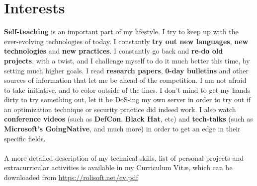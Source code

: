 \documentclass[11pt,a4paper,sans]{moderncv}
\begin{document}
\section{Interests}
	\textbf{Self-teaching} is an important part of my lifestyle. I try to keep up with the ever-evolving technologies of today. I constantly \textbf{try out new languages}, \textbf{new technologies} and \textbf{new practices}. I constantly go back and \textbf{re-do old projects}, with a twist, and I challenge myself to do it much better this time, by setting much higher goals. I read \textbf{research papers}, \textbf{0-day bulletins} and other sources of information that let me be ahead of the competition. I am not afraid to take initiative, and to color outside of the lines. I don't mind to get my hands dirty to try something out, let it be DoS-ing my own server in order to try out if an optimization technique or security practice did indeed work. I also watch \textbf{conference videos} (such as \textbf{DefCon}, \textbf{Black Hat}, etc) and \textbf{tech-talks} (such as \textbf{Microsoft's GoingNative}, and much more) in order to get an edge in their specific fields.
	\\\\
	{\color{color2} A more detailed description of my technical skills, list of personal projects and extracurricular activities is available in my Curriculum Vitæ, which can be downloaded from}
	{\color{color1} \url{https://rolisoft.net/cv.pdf}}
	
\end{document}
